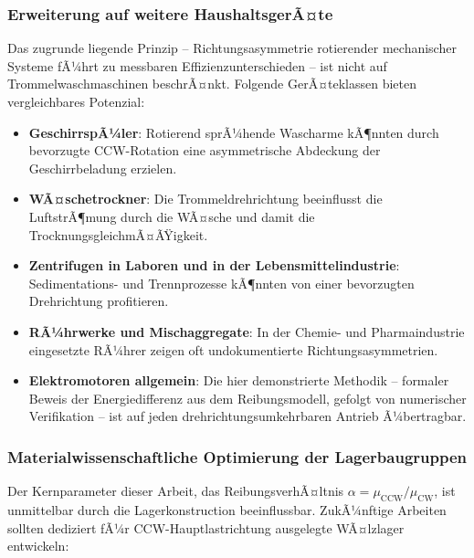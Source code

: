 ﻿\documentclass[12pt,a4paper]{article}
\theoremstyle{remark}
\newcommand{\CCW}{\mathrm{CCW}}
\newcommand{\CW}{\mathrm{CW}}
\begin{document}
	\subsubsection{Erweiterung auf weitere HaushaltsgerÃ¤te}
	
	Das zugrunde liegende Prinzip -- Richtungsasymmetrie rotierender mechanischer Systeme
	fÃ¼hrt zu messbaren Effizienzunterschieden -- ist nicht auf Trommelwaschmaschinen
	beschrÃ¤nkt. Folgende GerÃ¤teklassen bieten vergleichbares Potenzial:
	
	\begin{itemize}
		\item \textbf{GeschirrspÃ¼ler}: Rotierend sprÃ¼hende Wascharme kÃ¶nnten durch
		bevorzugte CCW-Rotation eine asymmetrische Abdeckung der Geschirrbeladung erzielen.
		\item \textbf{WÃ¤schetrockner}: Die Trommeldrehrichtung beeinflusst die LuftstrÃ¶mung
		durch die WÃ¤sche und damit die TrocknungsgleichmÃ¤ÃŸigkeit.
		\item \textbf{Zentrifu\-gen in Laboren und in der Lebensmittelindustrie}: Sedimentations-
		und Trennprozesse kÃ¶nnten von einer bevorzugten Drehrichtung profitieren.
		\item \textbf{RÃ¼hrwerke und Mischaggregate}: In der Chemie- und Pharmaindustrie
		eingesetzte RÃ¼hrer zeigen oft undokumentierte Richtungsasymmetrien.
		\item \textbf{Elektromotoren allgemein}: Die hier demonstrierte Methodik -- formaler
		Beweis der Energiedifferenz aus dem Reibungsmodell, gefolgt von numerischer Verifikation --
		ist auf jeden drehrichtungsumkehrbaren Antrieb Ã¼bertragbar.
	\end{itemize}
	
	\subsubsection{Materialwissenschaftliche Optimierung der Lagerbaugruppen}
	
	Der Kernparameter dieser Arbeit, das ReibungsverhÃ¤ltnis $\alpha = \mu_{\CCW}/\mu_{\CW}$,
	ist unmittelbar durch die Lagerkonstruction beeinflussbar. ZukÃ¼nftige Arbeiten sollten
	dediziert fÃ¼r CCW-Hauptlastrichtung ausgelegte WÃ¤lzlager entwickeln:
	
\end{document}
